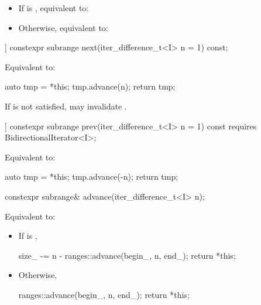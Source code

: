 \begin{addedblock}
\begin{itemdescr}
\pnum
\effects
\begin{itemize}
\item If  is , equivalent to: 
\item Otherwise, equivalent to: 
\end{itemize}
\end{itemdescr}

%
\begin{itemdecl}
[[nodiscard]] constexpr subrange next(iter_difference_t<I> n = 1) const;
\end{itemdecl}

\begin{itemdescr}
\pnum
\effects Equivalent to:
\begin{codeblock}
auto tmp = *this;
tmp.advance(n);
return tmp;
\end{codeblock}

\pnum
\begin{note}
If  is not satisfied, 
may invalidate .
\end{note}
\end{itemdescr}

%
\begin{itemdecl}
[[nodiscard]] constexpr subrange prev(iter_difference_t<I> n = 1) const
  requires BidirectionalIterator<I>;
\end{itemdecl}

\begin{itemdescr}
\pnum
\effects Equivalent to:
\begin{codeblock}
auto tmp = *this;
tmp.advance(-n);
return tmp;
\end{codeblock}
\end{itemdescr}

%
\begin{itemdecl}
constexpr subrange& advance(iter_difference_t<I> n);
\end{itemdecl}

\begin{itemdescr}
\pnum
\effects Equivalent to:
\begin{itemize}
\item If  is ,
\begin{codeblock}
size_ -= n - ranges::advance(begin_, n, end_);
return *this;
\end{codeblock}
\item Otherwise,
\begin{codeblock}
ranges::advance(begin_, n, end_);
return *this;
\end{codeblock}
\end{itemize}
\end{itemdescr}


\end{addedblock}
